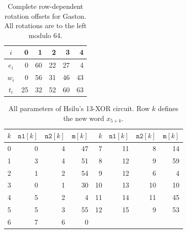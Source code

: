 
\begin{table}[t]
\caption{Complete row-dependent rotation offsets for Gaston. All rotations are to the left modulo 64.}\label{tab:gaston-parameters}
\centering\small
\begin{tabular}{c|rrrrr}
\toprule
$i$&0&1&2&3&4\\
\midrule
$e_i$&0&60&22&27&4\\
$w_i$&0&56&31&46&43\\
$t_i$&25&32&52&60&63\\
\bottomrule
\end{tabular}
\end{table}

\begin{table}[t]
\caption{All parameters of Hsilu's 13-XOR circuit. Row $k$ defines the new word $x_{5+k}$.}\label{tab:hsilu-parameters}
\centering\small\setlength{\tabcolsep}{5.5pt}
\begin{tabular}{rrrr|rrrr}
\toprule
$k$&$\mathtt{n1}[k]$&$\mathtt{n2}[k]$&$\mathtt{m}[k]$&$k$&$\mathtt{n1}[k]$&$\mathtt{n2}[k]$&$\mathtt{m}[k]$\\
\midrule
0&0&4&47&7&11&8&14\\
1&3&4&51&8&12&9&59\\
2&1&2&54&9&12&6&4\\
3&0&1&30&10&13&10&10\\
4&5&2&4&11&14&11&45\\
5&5&3&55&12&15&9&53\\
6&7&6&0&&&&\\
\bottomrule
\end{tabular}
\end{table}

